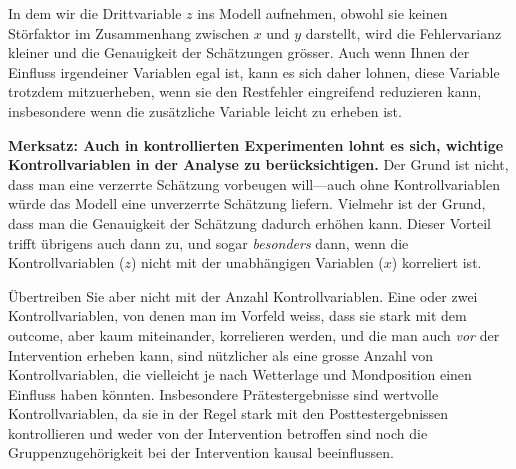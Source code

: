 \documentclass[oneside, 10pt]{book}\usepackage[]{graphicx}\usepackage[]{xcolor}
\begin{document}
In dem wir die Drittvariable $z$ ins Modell aufnehmen, obwohl sie
keinen Störfaktor im Zusammenhang zwischen $x$ und $y$ darstellt,
wird die Fehlervarianz kleiner und die Genauigkeit der Schätzungen
grösser.
Auch wenn Ihnen
der Einfluss irgendeiner Variablen egal ist, kann es sich daher lohnen, diese Variable
trotzdem mitzuerheben, wenn sie den Restfehler eingreifend reduzieren kann, insbesondere
wenn die zusätzliche Variable leicht zu erheben ist.

\medskip

\begin{framed}
\noindent \textbf{Merksatz: Auch in kontrollierten Experimenten lohnt es sich, wichtige Kontrollvariablen in der Analyse zu berücksichtigen.}
Der Grund ist nicht, dass man eine verzerrte Schätzung vorbeugen will---auch ohne Kontrollvariablen
würde das Modell eine unverzerrte Schätzung liefern.
Vielmehr ist der Grund, dass man die Genauigkeit der Schätzung dadurch erhöhen kann.
Dieser Vorteil trifft übrigens auch dann zu, und sogar \emph{besonders} dann, wenn
die Kontrollvariablen ($z$) nicht mit der unabhängigen Variablen ($x$) korreliert ist.

Übertreiben Sie aber nicht mit der Anzahl Kontrollvariablen. Eine oder zwei Kontrollvariablen,
von denen man im Vorfeld weiss, dass sie stark mit dem outcome, aber kaum miteinander,
korrelieren werden, und die man auch \emph{vor} der Intervention erheben kann, sind nützlicher als eine grosse
Anzahl von Kontrollvariablen, die vielleicht je nach Wetterlage und Mondposition
einen Einfluss haben könnten. Insbesondere Prätestergebnisse sind wertvolle Kontrollvariablen,
da sie in der Regel stark mit den Posttestergebnissen kontrollieren und weder von der Intervention
betroffen sind noch die Gruppenzugehörigkeit bei der Intervention kausal beeinflussen.
\end{framed}
\end{document}
